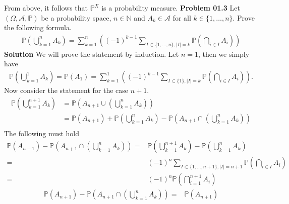 \documentclass[a4paper]{book}
\theoremstyle{definition}
\begin{document}
From above, it follows that \(\mathbb{P}^X\) is a probability measure.
\newpage
\noindent\textbf{Problem 01.3}
Let \((\Omega, \mathcal{A}, \mathbb{P})\) be a probability space, \(n \in \mathbb{N}\) and \(A_k \in \mathcal{A}\) for all \(k \in \{1, \dots, n\}\). Prove the following formula.
\begin{align}
    \mathbb{P} \left( \bigcup_{k=1}^n A_k \right) = \sum_{k = 1}^n \left( (-1)^{k-1} \sum_{I \subset \{1, \dots, n\}, |I| = k } \mathbb{P} \left( \bigcap_{i \in I} A_i \right) \right)
\end{align}
\newline
\newline
\textbf{Solution}
We will prove the statement by induction. Let \(n = 1\), then we simply have
\begin{align}
    \mathbb{P} \left( \bigcup_{k = 1}^1 A_k \right) = \mathbb{P} (A_1) = \sum_{k = 1}^1 \left( (-1)^{k-1} \sum_{I \subset \{1\}, |I| = k } \mathbb{P} \left( \bigcap_{i \in I} A_i \right) \right) \text{.}
\end{align}
Now consider the statement for the case \(n + 1\).
\begin{align}
    \mathbb{P} \left( \bigcup_{k=1}^{n+1} A_k \right) &= \mathbb{P} \left( A_{n+1} \cup \left( \bigcup_{k=1}^{n} A_k \right) \right) \\
    &= \mathbb{P} (A_{n+1}) + \mathbb{P} \left( \bigcup_{k=1}^{n} A_k \right) - \mathbb{P} \left( A_{n+1} \cap \left( \bigcup_{k=1}^{n} A_k \right) \right) \\
\end{align}
The following must hold
\begin{align}
    \mathbb{P}(A_{n+1}) - \mathbb{P} \left( A_{n+1} \cap \left( \bigcup_{k=1}^{n} A_k \right) \right) =& \mathbb{P} \left( \bigcup_{k=1}^{n+1} A_k \right) - \mathbb{P} \left(\bigcup_{k=1}^n A_k \right)\\
    =&(-1)^n \sum_{I \subset \{1, \dots, n+1\}, |I| = n+1} \mathbb{P} \left( \bigcap_{i \in I} A_i \right)\\
    =& (-1)^{n} \mathbb{P} \left( \bigcap_{i=1}^{n+1} A_i \right)
\end{align}
\begin{align}
    \mathbb{P}(A_{n+1}) - \mathbb{P} \left( A_{n+1} \cap \left( \bigcup_{k=1}^{n} A_k \right) \right) =& \mathbb{P} (A_{n+1}) 
\end{align}
\end{document}
